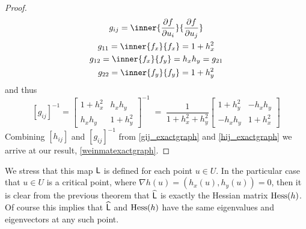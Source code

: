 \begin{proof}
	 
	 
	 \begin{equation}
	 \begin{gathered}
	 g_{ij} = \inner{\frac{\partial f}{\partial u_i}}{\frac{\partial f}{\partial u_j}} \\
	 g_{11} = \inner{f_x}{f_x} = 1 + h_x^2 \\
	 g_{12} = \inner{f_x}{f_y} = h_x h_y = g_{21} \\
	 g_{22} = \inner{f_y}{f_y} = 1 + h_y^2
	 \end{gathered}
	 \end{equation}
	 and thus
		\begin{equation} \label{gij_exactgraph}		 
		[g_{ij}]^{-1} = \begin{bmatrix} 1 + h_x^2 & h_x h_y \\
					h_x h_y & 1 + h_y^2 \end{bmatrix}^{-1}
					\;=\;	\frac{1}{1+h_x^2 +h_y^2}
					\begin{bmatrix} 1 + h_y^2 & -h_x h_y \\
					-	h_x h_y & 1 + h_x^2 \end{bmatrix}
		\end{equation}
       	Combining $[h_{ij}]$ and $[g_{ij}]^{-1}$ from \cref{gij_exactgraph} and \cref{hij_exactgraph}
       	we arrive at our result, \cref{weinmatexactgraph}.
       	\end{proof}
       	
  We stress that this map $\mathsf{L}$ is defined for each point $u \in U$.
  In the particular case that $u \in  U$ is a critical point, where $\nabla h(u) = (h_x(u), h_y(u)) = 0$, then it is clear from the previous theorem that $\widehat{\mathsf{L}}$ is exactly the Hessian matrix $\mathrm{Hess}(h)$. Of course this implies that $\widehat{\mathsf{L}}$ and $\mathrm{Hess}{(h)}$ have the same eigenvalues and eigenvectors at any such point.

